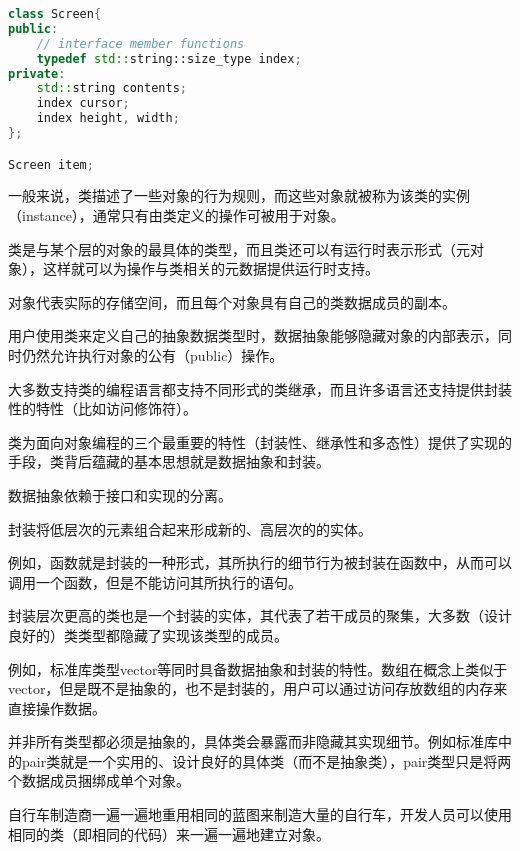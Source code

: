 \begin{lstlisting}[language=C++]
class Screen{
public:
	// interface member functions
	typedef std::string::size_type index;
private:
	std::string contents;
	index cursor;
	index height, width;
};

Screen item;
\end{lstlisting}


一般来说，类描述了一些对象的行为规则，而这些对象就被称为该类的实例（instance），通常只有由类定义的操作可被用于对象。


\begin{compactitem}
\item 类是与某个层的对象的最具体的类型，而且类还可以有运行时表示形式（元对象），这样就可以为操作与类相关的元数据提供运行时支持。
\item 对象代表实际的存储空间，而且每个对象具有自己的类数据成员的副本。
\end{compactitem}



用户使用类来定义自己的抽象数据类型时，数据抽象能够隐藏对象的内部表示，同时仍然允许执行对象的公有（public）操作。


大多数支持类的编程语言都支持不同形式的类继承，而且许多语言还支持提供封装性的特性（比如访问修饰符）。

类为面向对象编程的三个最重要的特性（封装性、继承性和多态性）提供了实现的手段，类背后蕴藏的基本思想就是数据抽象和封装。

\begin{compactitem}
\item 数据抽象依赖于接口和实现的分离。
\item 封装将低层次的元素组合起来形成新的、高层次的的实体。
\end{compactitem}

例如，函数就是封装的一种形式，其所执行的细节行为被封装在函数中，从而可以调用一个函数，但是不能访问其所执行的语句。

封装层次更高的类也是一个封装的实体，其代表了若干成员的聚集，大多数（设计良好的）类类型都隐藏了实现该类型的成员。

例如，标准库类型vector等同时具备数据抽象和封装的特性。数组在概念上类似于vector，但是既不是抽象的，也不是封装的，用户可以通过访问存放数组的内存来直接操作数据。

并非所有类型都必须是抽象的，具体类会暴露而非隐藏其实现细节。例如标准库中的pair类就是一个实用的、设计良好的具体类（而不是抽象类），pair类型只是将两个数据成员捆绑成单个对象。


自行车制造商一遍一遍地重用相同的蓝图来制造大量的自行车，开发人员可以使用相同的类（即相同的代码）来一遍一遍地建立对象。



